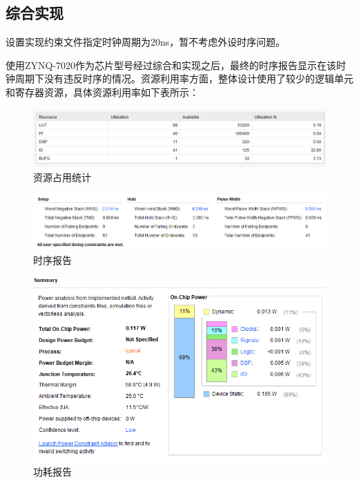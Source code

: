\documentclass[UTF8]{ctexart}
\begin{document}
\subsection{综合实现}
	设置实现约束文件指定时钟周期为20ns，暂不考虑外设时序问题。
	\par 使用ZYNQ-7020作为芯片型号经过综合和实现之后，最终的时序报告显示在该时钟周期下没有违反时序的情况。资源利用率方面，整体设计使用了较少的逻辑单元和寄存器资源，具体资源利用率如下表所示：
\begin{figure}[H]
	\centering
	\includegraphics[scale=0.7]{usage.png}
	\caption{资源占用统计}	
\end{figure}
\begin{figure}[H]
	\centering
	\includegraphics[scale=0.7]{timming.png}
	\caption{时序报告}	
\end{figure}
\begin{figure}[H]
	\centering
	\includegraphics[scale=0.7]{power.png}
	\caption{功耗报告}	
\end{figure}
\end{document}
